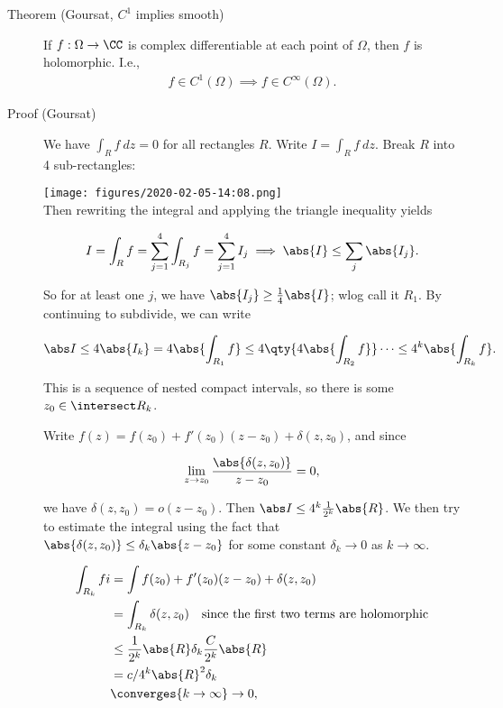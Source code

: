 \begin{description}
\item[Theorem (Goursat, \(C^1\) implies smooth)]
If \(f: \Omega \to \CC\) is complex differentiable at each point of
\(\Omega\), then \(f\) is holomorphic. I.e.,
\begin{align*}f\in C^1(\Omega) \implies f\in C^\infty(\Omega).\end{align*}
\item[Proof (Goursat)]
We have \(\int_R f ~dz = 0\) for all rectangles \(R\). Write
\(I = \int_R f ~dz\). Break \(R\) into 4 sub-rectangles:

\texttt{[image: figures/2020-02-05-14:08.png]}\\

Then rewriting the integral and applying the triangle inequality yields

\begin{align*}
I = \int_R f = \sum_{j=1}^4 \int_{R_j} f  = \sum_{j=1}^4 I_j \implies \abs{I} \leq \sum_j \abs{I_j}
.\end{align*}

So for at least one \(j\), we have \(\abs{I_j} \geq \frac 1 4 \abs{I}\);
wlog call it \(R_1\). By continuing to subdivide, we can write

\begin{align*}
\abs I \leq 4 \abs {I_k} = 4 \abs{\int_{R_1} f} \leq 4\qty{4 \abs{ \int_{R_2} f }  } \cdots \leq 4^k \abs{\int_{R_k} f}
.\end{align*}

This is a sequence of nested compact intervals, so there is some
\(z_0 \in \intersect R_k\).

Write \(f(z) = f(z_0) + f'(z_0)(z-z_0) + \delta(z, z_0)\), and since

\begin{align*}
\lim_{z\to z_0} \frac{\abs{\delta(z, z_0)}}{z-z_0} = 0
,\end{align*}

we have \(\delta(z, z_0) = o(z-z_0)\). Then
\(\abs I \leq 4^k \frac{1}{2^k} \abs{R}\). We then try to estimate the
integral using the fact that
\(\abs{\delta(z, z_0)} \leq \delta_k \abs{z-z_0}\) for some constant
\(\delta_k \to 0\) as \(k\to \infty\).

\begin{align*}
\int_{R_k} f i
&= \int f(z_0) + f'(z_0)(z-z_0) + \delta(z, z_0) \\
&= \int_{R_k} \delta(z, z_0) \quad\text{since the first two terms are holomorphic} \\
&\leq \frac{1}{2^k} \abs{R} \delta_k \frac{C}{2^k} \abs{R} \\
& = c/4^k \abs{R}^2 \delta_k  \\
&\converges{k\to\infty}\to 0
,\end{align*}


\end{description}
